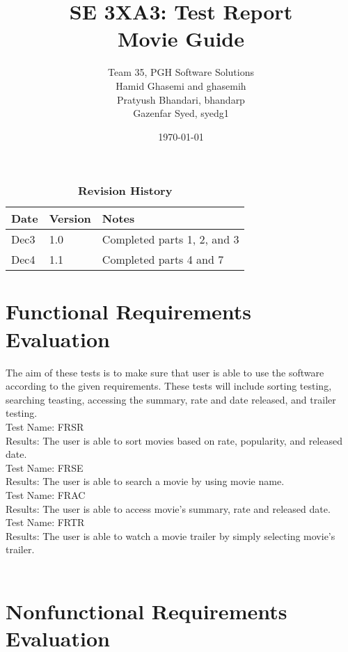\documentclass[12pt, titlepage]{article}
\title{SE 3XA3: Test Report\\Movie Guide}
\author{Team 35, PGH Software Solutions
		\\ Hamid Ghasemi and ghasemih
		\\ Pratyush Bhandari, bhandarp
		\\ Gazenfar Syed, syedg1
}
\date{\today}
\begin{document}
\maketitle

\tableofcontents
\listoftables
\listoffigures

\begin{table}[bp]
\caption{\bf Revision History}
\begin{tabularx}{\textwidth}{p{3cm}p{2cm}X}
\toprule {\bf Date} & {\bf Version} & {\bf Notes}\\
\midrule
Dec3 & 1.0 & Completed parts 1, 2, and 3\\
Dec4 & 1.1 & Completed parts 4 and 7\\
\bottomrule
\end{tabularx}
\end{table}

\newpage


\section{Functional Requirements Evaluation}
The aim of these tests is to make sure that user is able to use the software according to the given requirements. These tests will include sorting testing, searching teasting, accessing the summary, rate and date released, and trailer testing.\\

Test Name: FRSR \\
Results: The user is able to sort movies based on rate, popularity, and released date. \\ 

Test Name: FRSE \\
Results: The user is able to search a movie by using movie name. \\ 

Test Name: FRAC \\
Results: The user is able to access movie's summary, rate and released date.\\ 

Test Name: FRTR\\
Results: The user is able to watch a movie trailer by simply selecting movie's trailer. \\ \\

\section{Nonfunctional Requirements Evaluation}
\end{document}
